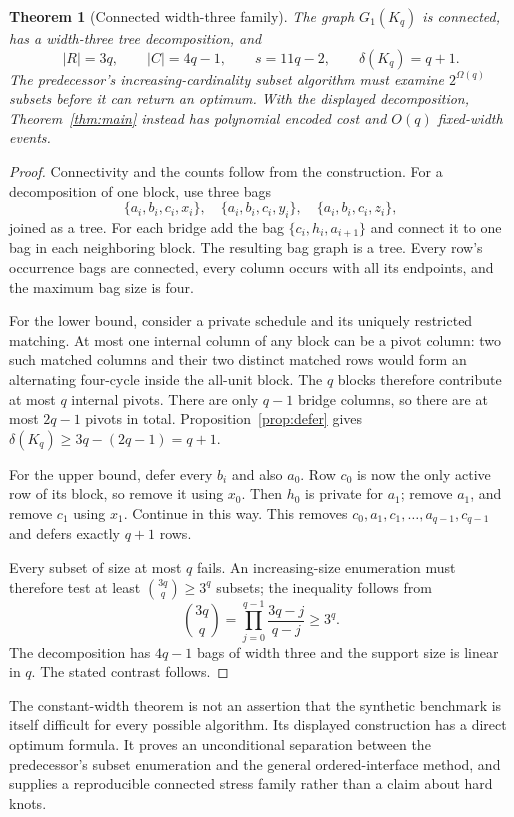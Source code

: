\documentclass[11pt]{article}
\newtheorem{theorem}{Theorem}[section]
\theoremstyle{definition}\newtheorem{definition}[theorem]{Definition}
\theoremstyle{remark}\newtheorem{remark}[theorem]{Remark}
\begin{document}
\begin{theorem}[Connected width-three family]
\label{thm:chain}
The graph $G_1(K_q)$ is connected, has a width-three tree decomposition, and
\begin{equation}
 |R|=3q,\qquad |C|=4q-1,\qquad s=11q-2,\qquad
 \delta(K_q)=q+1.
 \label{eq:chain}
\end{equation}
The predecessor's increasing-cardinality subset algorithm must examine $2^{\Omega(q)}$ subsets before it can return an optimum. With the displayed decomposition, Theorem~\ref{thm:main} instead has polynomial encoded cost and $O(q)$ fixed-width events.
\end{theorem}
\begin{proof}
Connectivity and the counts follow from the construction. For a decomposition of one block, use three bags
\[
 \{a_i,b_i,c_i,x_i\},\quad
 \{a_i,b_i,c_i,y_i\},\quad
 \{a_i,b_i,c_i,z_i\},
\]
joined as a tree. For each bridge add the bag $\{c_i,h_i,a_{i+1}\}$ and connect it to one bag in each neighboring block. The resulting bag graph is a tree. Every row's occurrence bags are connected, every column occurs with all its endpoints, and the maximum bag size is four.

For the lower bound, consider a private schedule and its uniquely restricted matching. At most one internal column of any block can be a pivot column: two such matched columns and their two distinct matched rows would form an alternating four-cycle inside the all-unit block. The $q$ blocks therefore contribute at most $q$ internal pivots. There are only $q-1$ bridge columns, so there are at most $2q-1$ pivots in total. Proposition~\ref{prop:defer} gives $\delta(K_q)\ge3q-(2q-1)=q+1$.

For the upper bound, defer every $b_i$ and also $a_0$. Row $c_0$ is now the only active row of its block, so remove it using $x_0$. Then $h_0$ is private for $a_1$; remove $a_1$, and remove $c_1$ using $x_1$. Continue in this way. This removes $c_0,a_1,c_1,\ldots,a_{q-1},c_{q-1}$ and defers exactly $q+1$ rows.

Every subset of size at most $q$ fails. An increasing-size enumeration must therefore test at least $\binom{3q}{q}\ge 3^q$ subsets; the inequality follows from
\[
 \binom{3q}{q}=\prod_{j=0}^{q-1}\frac{3q-j}{q-j}\ge3^q.
\]
The decomposition has $4q-1$ bags of width three and the support size is linear in $q$. The stated contrast follows.
\end{proof}

The constant-width theorem is not an assertion that the synthetic benchmark is itself difficult for every possible algorithm. Its displayed construction has a direct optimum formula. It proves an unconditional separation between the predecessor's subset enumeration and the general ordered-interface method, and supplies a reproducible connected stress family rather than a claim about hard knots.
\end{document}
